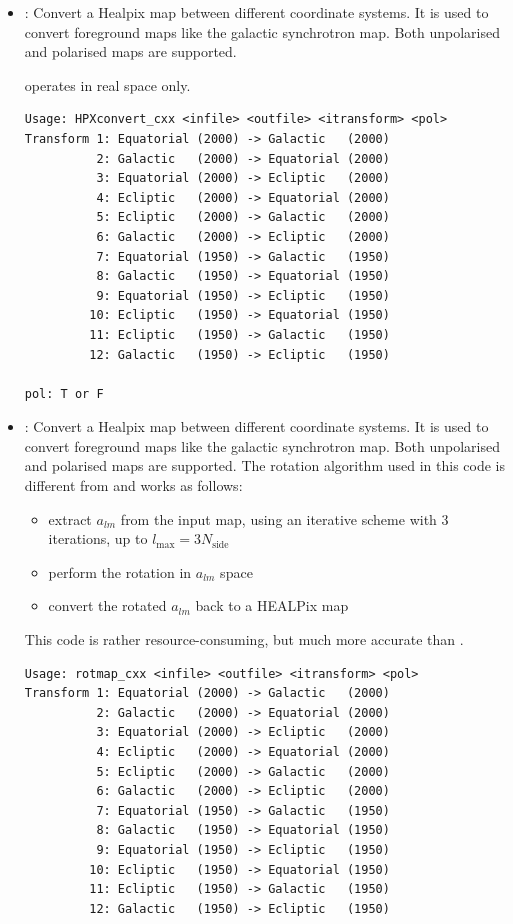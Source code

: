 \begin{itemize}

\item {}: Convert a Healpix map between different
coordinate systems. It is used to convert foreground maps like the galactic
synchrotron map. Both unpolarised and polarised maps are supported.

 operates in real space only.

\begin{verbatim}
Usage: HPXconvert_cxx <infile> <outfile> <itransform> <pol>
Transform 1: Equatorial (2000) -> Galactic   (2000)
          2: Galactic   (2000) -> Equatorial (2000)
          3: Equatorial (2000) -> Ecliptic   (2000)
          4: Ecliptic   (2000) -> Equatorial (2000)
          5: Ecliptic   (2000) -> Galactic   (2000)
          6: Galactic   (2000) -> Ecliptic   (2000)
          7: Equatorial (1950) -> Galactic   (1950)
          8: Galactic   (1950) -> Equatorial (1950)
          9: Equatorial (1950) -> Ecliptic   (1950)
         10: Ecliptic   (1950) -> Equatorial (1950)
         11: Ecliptic   (1950) -> Galactic   (1950)
         12: Galactic   (1950) -> Ecliptic   (1950)

pol: T or F
\end{verbatim}

\item {}: Convert a Healpix map between different
coordinate systems. It is used to convert foreground maps like the galactic
synchrotron map. Both unpolarised and polarised maps are supported.
The rotation algorithm used in this code is different from
 and works as follows:
\begin{itemize}
  \item extract $a_{lm}$ from the input map, using an iterative scheme
        with 3 iterations, up to $l_{\mbox{max}}=3N_{\mbox{side}}$
  \item perform the rotation in $a_{lm}$ space
  \item convert the rotated $a_{lm}$ back to a HEALPix map
\end{itemize}
This code is rather resource-consuming, but much more accurate than
.

\begin{verbatim}
Usage: rotmap_cxx <infile> <outfile> <itransform> <pol>
Transform 1: Equatorial (2000) -> Galactic   (2000)
          2: Galactic   (2000) -> Equatorial (2000)
          3: Equatorial (2000) -> Ecliptic   (2000)
          4: Ecliptic   (2000) -> Equatorial (2000)
          5: Ecliptic   (2000) -> Galactic   (2000)
          6: Galactic   (2000) -> Ecliptic   (2000)
          7: Equatorial (1950) -> Galactic   (1950)
          8: Galactic   (1950) -> Equatorial (1950)
          9: Equatorial (1950) -> Ecliptic   (1950)
         10: Ecliptic   (1950) -> Equatorial (1950)
         11: Ecliptic   (1950) -> Galactic   (1950)
         12: Galactic   (1950) -> Ecliptic   (1950)


\end{verbatim}
\end{itemize}
